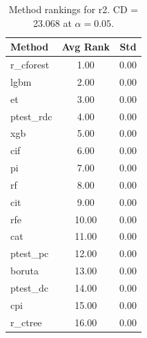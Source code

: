 \begin{table}[h]
\centering
\caption{Method rankings for r2. CD = 23.068 at $\alpha=0.05$.}
\label{tab:ranks_r2}
\begin{tabular}{lcc}
\toprule
Method & Avg Rank & Std \\
\midrule
r_cforest & 1.00 & 0.00 \\
lgbm & 2.00 & 0.00 \\
et & 3.00 & 0.00 \\
ptest_rdc & 4.00 & 0.00 \\
xgb & 5.00 & 0.00 \\
cif & 6.00 & 0.00 \\
pi & 7.00 & 0.00 \\
rf & 8.00 & 0.00 \\
cit & 9.00 & 0.00 \\
rfe & 10.00 & 0.00 \\
cat & 11.00 & 0.00 \\
ptest_pc & 12.00 & 0.00 \\
boruta & 13.00 & 0.00 \\
ptest_dc & 14.00 & 0.00 \\
cpi & 15.00 & 0.00 \\
r_ctree & 16.00 & 0.00 \\
\bottomrule
\end{tabular}
\end{table}
